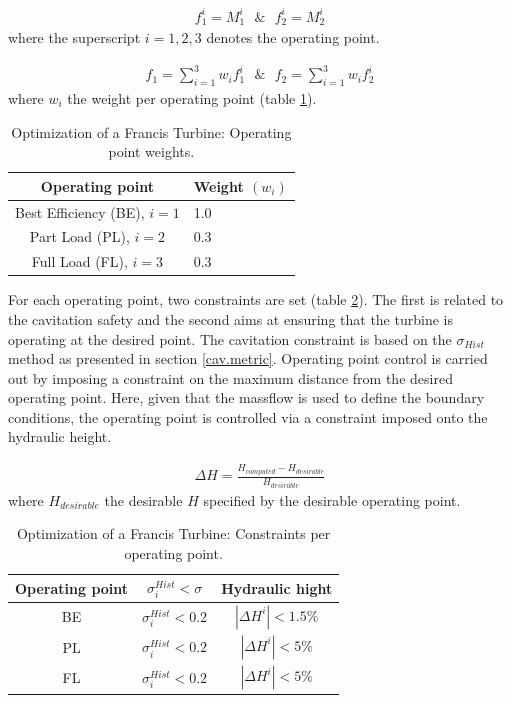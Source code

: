 \begin{eqnarray}
   f_1^i=M_1^i ~~~\&~~~ f_2^i=M_2^i 
   \label{ObjFrancis} 
\end{eqnarray}
where the superscript $i=1,2,3$ denotes the operating point.

\begin{eqnarray}
   f_1=\sum^3_{i=1}w_if_1^i ~~~\&~~~ f_2=\sum^3_{i=1}w_if_2^i 
   \label{ObjFrancis2} 
\end{eqnarray}
where $w_i$ the weight per operating point (table \ref{op-weights}).


\begin{table}[h!]
\begin{center}
\begin{tabular}{ |c|l| }
\hline
Operating point& Weight $(w_i)$\\
\hline
Best Efficiency (BE), $i=1$ & 1.0\\
\hline
Part Load (PL), $i=2$ & 0.3\\
\hline
Full Load (FL), $i=3$ & 0.3\\
\hline
\end{tabular}
\caption{Optimization of a Francis Turbine: Operating point weights.}
\label{op-weights}
\end{center}
\end{table}


For each operating point, two constraints are set (table \ref{Cons}). The first is related to the cavitation safety and the second aims at ensuring that the turbine is operating at the desired point. The cavitation constraint is based on the $\sigma_{Hist}$ method as presented in section \ref{cav.metric}. Operating point control is carried out by imposing a constraint on the maximum distance from the desired operating point. Here, given that the massflow is used to define the boundary conditions, the operating point is controlled via a constraint imposed onto the hydraulic height.     


\begin{eqnarray}
   \Delta H=\frac{H_{computed}-H_{desirable}}{H_{desirable}} 
   \label{ConstFrancis} 
\end{eqnarray}
where $H_{desirable}$ the desirable $H$ specified by the desirable operating point.

\begin{table}[h!]
\begin{center}
\begin{tabular}{ |c|c|c| }
\hline
Operating point & $\sigma_i^{Hist}<\sigma$ & Hydraulic hight\\
\hline
BE & $\sigma_i^{Hist}<0.2$ & $|\Delta H^i|<1.5\%$\\
\hline
PL       & $\sigma_i^{Hist}<0.2$ & $|\Delta H^i|<5\%$\\
\hline
FL       & $\sigma_i^{Hist}<0.2$ & $|\Delta H^i|<5\%$\\
\hline
\end{tabular}
\caption{Optimization of a Francis Turbine: Constraints per operating point.}
\label{Cons}
\end{center}
\end{table}


